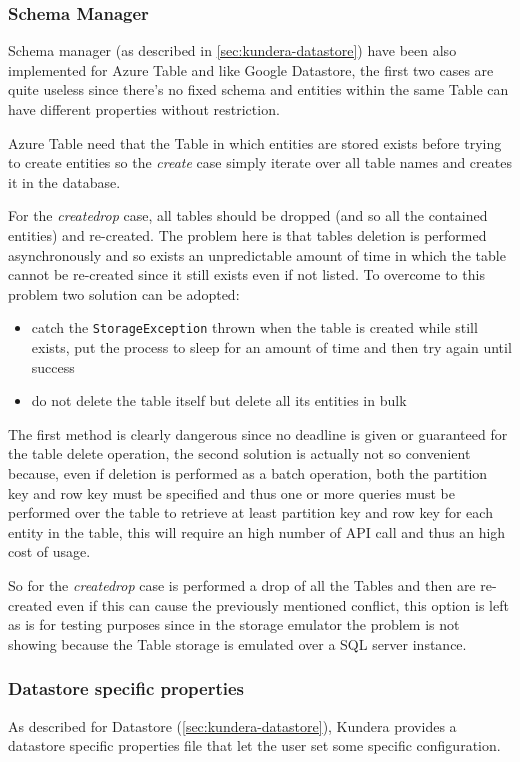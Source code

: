 \subsubsection{Schema Manager}
Schema manager (as described in \ref{sec:kundera-datastore}) have been also implemented for Azure Table and like Google Datastore, the first two cases are quite useless since there's no fixed schema and entities within the same Table can have different properties without restriction.

\noindent Azure Table need that the Table in which entities are stored exists before trying to create entities so the \textit{create} case simply iterate over all table names and creates it in the database. 

\noindent For the \textit{create\textunderscore drop} case, all tables should be dropped (and so all the contained entities) and re-created. The problem here is that tables deletion is performed asynchronously and so exists an unpredictable amount of time in which the table cannot be re-created since it still exists even if not listed.
\noindent To overcome to this problem two solution can be adopted:
\begin{itemize}
\item catch the \texttt{StorageException} thrown when the table is created while still exists, put the process to sleep for an amount of time and then try again until success
\item do not delete the table itself but delete all its entities in bulk
\end{itemize}

\noindent The first method is clearly dangerous since no deadline is given or guaranteed for the table delete operation, the second solution is actually not so convenient because, even if deletion is performed as a batch operation, both the partition key and row key must be specified and thus one or more queries must be performed over the table to retrieve at least partition key and row key for each entity in the table, this will require an high number of API call and thus an high cost of usage.

\noindent So for the \textit{create\textunderscore drop} case is performed a drop of all the Tables and then are re-created even if this can cause the previously mentioned conflict, this option is left as is for testing purposes since in the storage emulator the problem is not showing because the Table storage is emulated over a SQL server instance.

\subsubsection{Datastore specific properties}
As described for Datastore (\ref{sec:kundera-datastore}), Kundera provides a datastore specific properties file that let the user set some specific configuration.

